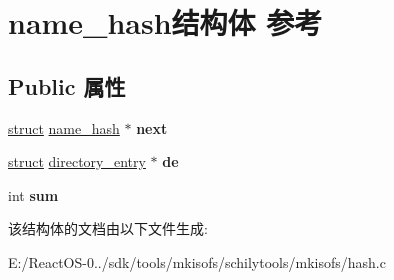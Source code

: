 \hypertarget{structname__hash}{}\section{name\+\_\+hash结构体 参考}
\label{structname__hash}
\subsection*{Public 属性}
\begin{DoxyCompactItemize}
\item 
\mbox{\label{structname__hash_ae95203aa6f2260e11697e276eeecbdfa}} 
\hyperlink{interfacestruct}{struct} \hyperlink{structname__hash}{name\+\_\+hash} $\ast$ {\bfseries next}
\item 
\mbox{\label{structname__hash_a15f1404cec117edb1fea35d42d673b5b}} 
\hyperlink{interfacestruct}{struct} \hyperlink{structdirectory__entry}{directory\+\_\+entry} $\ast$ {\bfseries de}
\item 
\mbox{\label{structname__hash_a3e81c3c0033c984ce0a6f9c4a25bf05d}} 
int {\bfseries sum}
\end{DoxyCompactItemize}


该结构体的文档由以下文件生成\+:\begin{DoxyCompactItemize}
\item 
E\+:/\+React\+O\+S-\/0../sdk/tools/mkisofs/schilytools/mkisofs/hash.\+c\end{DoxyCompactItemize}
